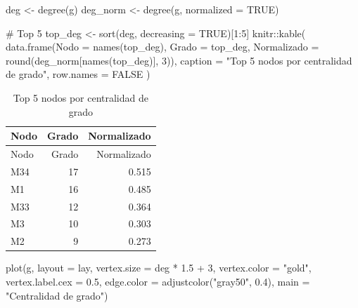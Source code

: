 \documentclass[
  letterpaper,
  DIV=11,
  numbers=noendperiod]{scrreprt}
\newenvironment{Shaded}{\begin{snugshade}}{\end{snugshade}}
\newcommand{\AttributeTok}[1]{\textcolor[rgb]{0.40,0.45,0.13}{#1}}
\newcommand{\CommentTok}[1]{\textcolor[rgb]{0.37,0.37,0.37}{#1}}
\newcommand{\ConstantTok}[1]{\textcolor[rgb]{0.56,0.35,0.01}{#1}}
\newcommand{\DecValTok}[1]{\textcolor[rgb]{0.68,0.00,0.00}{#1}}
\newcommand{\FloatTok}[1]{\textcolor[rgb]{0.68,0.00,0.00}{#1}}
\newcommand{\FunctionTok}[1]{\textcolor[rgb]{0.28,0.35,0.67}{#1}}
\newcommand{\NormalTok}[1]{\textcolor[rgb]{0.00,0.23,0.31}{#1}}
\newcommand{\OtherTok}[1]{\textcolor[rgb]{0.00,0.23,0.31}{#1}}
\newcommand{\SpecialCharTok}[1]{\textcolor[rgb]{0.37,0.37,0.37}{#1}}
\newcommand{\StringTok}[1]{\textcolor[rgb]{0.13,0.47,0.30}{#1}}
\begin{document}
\begin{Shaded}
\begin{Highlighting}[]
\NormalTok{deg }\OtherTok{\textless{}{-}} \FunctionTok{degree}\NormalTok{(g)}
\NormalTok{deg\_norm }\OtherTok{\textless{}{-}} \FunctionTok{degree}\NormalTok{(g, }\AttributeTok{normalized =} \ConstantTok{TRUE}\NormalTok{)}

\CommentTok{\# Top 5}
\NormalTok{top\_deg }\OtherTok{\textless{}{-}} \FunctionTok{sort}\NormalTok{(deg, }\AttributeTok{decreasing =} \ConstantTok{TRUE}\NormalTok{)[}\DecValTok{1}\SpecialCharTok{:}\DecValTok{5}\NormalTok{]}
\NormalTok{knitr}\SpecialCharTok{::}\FunctionTok{kable}\NormalTok{(}
  \FunctionTok{data.frame}\NormalTok{(}\AttributeTok{Nodo =} \FunctionTok{names}\NormalTok{(top\_deg), }\AttributeTok{Grado =}\NormalTok{ top\_deg, }
             \AttributeTok{Normalizado =} \FunctionTok{round}\NormalTok{(deg\_norm[}\FunctionTok{names}\NormalTok{(top\_deg)], }\DecValTok{3}\NormalTok{)),}
  \AttributeTok{caption =} \StringTok{"Top 5 nodos por centralidad de grado"}\NormalTok{,}
  \AttributeTok{row.names =} \ConstantTok{FALSE}
\NormalTok{)}
\end{Highlighting}
\end{Shaded}

\begin{longtable}[]{@{}lrr@{}}
\caption{Top 5 nodos por centralidad de grado}\tabularnewline
\toprule\noalign{}
Nodo & Grado & Normalizado \\
\midrule\noalign{}
\endfirsthead
\toprule\noalign{}
Nodo & Grado & Normalizado \\
\midrule\noalign{}
\endhead
\bottomrule\noalign{}
\endlastfoot
M34 & 17 & 0.515 \\
M1 & 16 & 0.485 \\
M33 & 12 & 0.364 \\
M3 & 10 & 0.303 \\
M2 & 9 & 0.273 \\
\end{longtable}

\begin{Shaded}
\begin{Highlighting}[]
\FunctionTok{plot}\NormalTok{(g, }\AttributeTok{layout =}\NormalTok{ lay,}
     \AttributeTok{vertex.size =}\NormalTok{ deg }\SpecialCharTok{*} \FloatTok{1.5} \SpecialCharTok{+} \DecValTok{3}\NormalTok{,}
     \AttributeTok{vertex.color =} \StringTok{"gold"}\NormalTok{,}
     \AttributeTok{vertex.label.cex =} \FloatTok{0.5}\NormalTok{,}
     \AttributeTok{edge.color =} \FunctionTok{adjustcolor}\NormalTok{(}\StringTok{"gray50"}\NormalTok{, }\FloatTok{0.4}\NormalTok{),}
     \AttributeTok{main =} \StringTok{"Centralidad de grado"}\NormalTok{)}
\end{Highlighting}
\end{Shaded}
\end{document}
